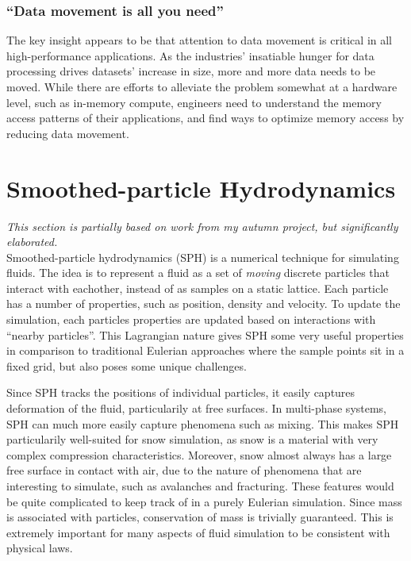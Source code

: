\subsubsection{``Data movement is all you need''}

The key insight appears to be that attention to data movement is critical in all
high-performance applications.
As the industries' insatiable hunger for data processing drives datasets'
increase in size, more and more data needs to be moved.
While there are efforts to alleviate the problem somewhat at a hardware level,
such as in-memory compute, %
engineers need to understand the memory access patterns of their applications,
and find ways to optimize memory access by reducing data movement.

\section{Smoothed-particle Hydrodynamics}
\label{sec:sph}
\textit{This section is partially based on work from my autumn
project, but significantly elaborated.}\\[.05em]

\noindent
Smoothed-particle hydrodynamics (SPH) is a numerical technique for simulating fluids.
The idea is to represent a fluid as a set of {\em moving} discrete particles that interact with
eachother, instead of as samples on a static lattice.
Each particle has a number of properties, such as position, density and velocity.
To update the simulation, each particles properties are updated based on interactions
with ``nearby particles''. This Lagrangian nature gives SPH some very useful properties in comparison
to traditional Eulerian approaches where the sample points sit in a fixed grid, but also poses some
unique challenges.

Since SPH tracks the positions of individual particles, it easily captures deformation of the fluid,
particularily at free surfaces.
\cite{citation needed}
In multi-phase systems, SPH can much more easily capture phenomena such as
mixing.
\cite{citation needed}
This makes SPH particularily well-suited for snow simulation, as snow is a material with very complex compression
characteristics.
\cite{citation needed}
Moreover, snow almost always has a large free surface in contact with air, due to the nature of
phenomena that are interesting to simulate, such as avalanches and fracturing.
These features would be quite complicated to keep track of in a purely Eulerian simulation.
Since mass is associated with particles, conservation of
mass is trivially guaranteed. This is extremely important for many aspects of fluid simulation to
be consistent with physical laws.
\cite{citation needed}

